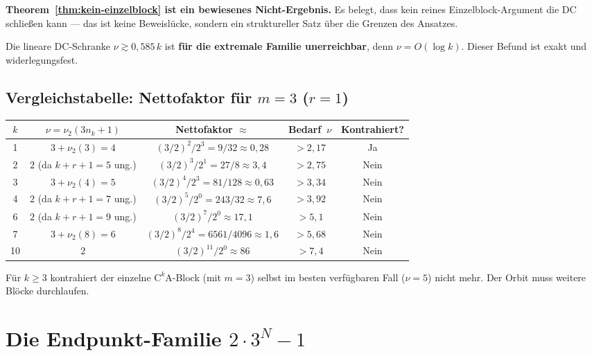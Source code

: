 \documentclass[12pt,a4paper]{article}
\newcommand{\vii}{\nu_2}
\begin{document}
\begin{tcolorbox}[ergebnis, title={Nicht-Ergebnis als Ergebnis}]
\textbf{Theorem~\ref{thm:kein-einzelblock} ist ein bewiesenes Nicht-Ergebnis.}
Es belegt, dass kein reines Einzelblock-Argument die DC schließen kann ---
das ist keine Beweislücke, sondern ein struktureller Satz über die Grenzen
des Ansatzes.

\medskip
Die lineare DC-Schranke $\nu \gtrsim 0{,}585\,k$ ist
\textbf{für die extremale Familie unerreichbar}, denn $\nu = O(\log k)$.
Dieser Befund ist exakt und widerlegungsfest.
\end{tcolorbox}

\subsection{Vergleichstabelle: Nettofaktor für $m = 3$ ($r = 1$)}

\begin{center}
\renewcommand{\arraystretch}{1.4}
\begin{tabular}{ccccc}
\toprule
$k$ & $\nu = \vii(3n_k+1)$ & Nettofaktor $\approx$ & Bedarf~$\nu$ & Kontrahiert? \\
\midrule
1 & $3 + \vii(3) = 4$ & $(3/2)^2/2^3 = 9/32 \approx 0{,}28$ & $>2{,}17$ & Ja \\
2 & $2$ (da $k+r+1=5$ ung.) & $(3/2)^3/2^1 = 27/8 \approx 3{,}4$ & $>2{,}75$ & Nein \\
3 & $3+\vii(4)=5$ & $(3/2)^4/2^3 = 81/128 \approx 0{,}63$ & $>3{,}34$ & Nein \\
4 & $2$ (da $k+r+1=7$ ung.) & $(3/2)^5/2^0 = 243/32 \approx 7{,}6$ & $>3{,}92$ & Nein \\
6 & $2$ (da $k+r+1=9$ ung.) & $(3/2)^7/2^0 \approx 17{,}1$ & $>5{,}1$ & Nein \\
7 & $3+\vii(8)=6$ & $(3/2)^8/2^4 = 6561/4096 \approx 1{,}6$ & $>5{,}68$ & Nein \\
10 & $2$ & $(3/2)^{11}/2^0 \approx 86$ & $>7{,}4$ & Nein \\
\bottomrule
\end{tabular}
\end{center}

Für $k \geq 3$ kontrahiert der einzelne $\mathrm{C}^k\mathrm{A}$-Block
(mit $m = 3$) selbst im besten verfügbaren Fall ($\nu = 5$) nicht mehr.
Der Orbit muss weitere Blöcke durchlaufen.

\section{Die Endpunkt-Familie $2\cdot 3^N - 1$}
\label{sec:endpunkte}
\end{document}
